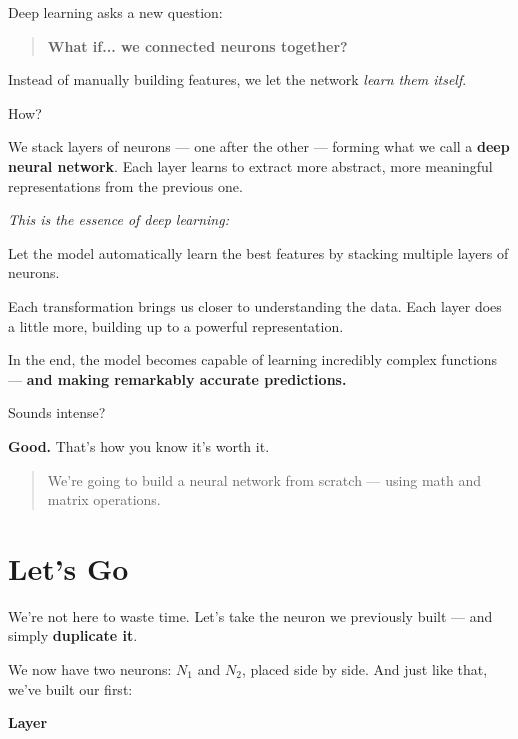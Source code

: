 \documentclass[11pt]{article}
\begin{document}
Deep learning asks a new question:

\begin{quote}
\textbf{What if... we connected neurons together?}
\end{quote}

Instead of manually building features, we let the network \textit{learn them itself}.

How?

We stack layers of neurons — one after the other — forming what we call a \textbf{deep neural network}.  
Each layer learns to extract more abstract, more meaningful representations from the previous one.

\textit{This is the essence of deep learning:}

\begin{insightbox}[title=Key Idea]
Let the model automatically learn the best features by stacking multiple layers of neurons.
\end{insightbox}

Each transformation brings us closer to understanding the data.  
Each layer does a little more, building up to a powerful representation.

In the end, the model becomes capable of learning incredibly complex functions —  
\textbf{and making remarkably accurate predictions.}

Sounds intense?

\textbf{Good.} That’s how you know it’s worth it.

\begin{quote}
We’re going to build a neural network from scratch — using math and matrix operations.
\end{quote}

\section{Let's Go}

We’re not here to waste time.  
Let’s take the neuron we previously built — and simply \textbf{duplicate it}.

We now have two neurons: $N_1$ and $N_2$, placed side by side.  
And just like that, we’ve built our first:

\begin{center}
    \textbf{\Large Layer}
\end{center}
\end{document}

